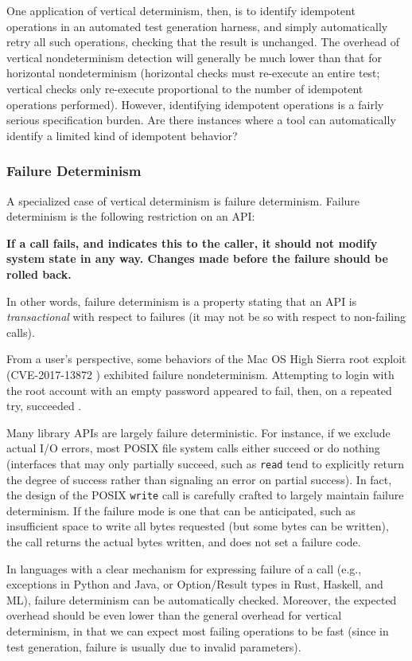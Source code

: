 One application of vertical determinism, then, is to identify
idempotent operations in an automated test generation harness, and
simply automatically retry all such operations, checking that the
result is unchanged.  The overhead of vertical nondeterminism detection will
generally be much lower than that for horizontal nondeterminism
(horizontal checks must re-execute an entire test; vertical checks
only re-execute proportional to the number of idempotent operations
performed).  However, identifying idempotent operations is a
fairly serious specification burden.  Are there instances where a tool
can automatically identify a limited kind of idempotent behavior?

\subsubsection{Failure Determinism}

A specialized case of vertical determinism is failure determinism.
Failure determinism is the following restriction on an API:

{\bf If a call fails, and indicates this to the caller, it should not modify system
  state in any way.  Changes made before the failure should be rolled
  back.} 

In other words, failure determinism is a property stating that an API
is \emph{transactional} with respect to failures (it may not be so
with respect to non-failing calls).

From a user's perspective, some behaviors of the Mac OS High Sierra
root exploit (CVE-2017-13872 \cite{applebug0}) exhibited failure
nondeterminism.  Attempting to login with the root account with an
empty password appeared to fail, then, on a repeated try, succeeded
\cite{applebug1,applebug2}. 

Many library APIs are largely failure deterministic.  For instance, if
we exclude actual I/O errors, most POSIX file system calls either
succeed or do nothing (interfaces that may only partially succeed,
such as {\tt read} tend to explicitly return the degree of success
rather than signaling an error on partial success).  In fact, the
design of the POSIX {\tt write} call is carefully crafted to largely maintain
failure determinism.  If the failure mode is one that can be
anticipated, such as insufficient space to write all bytes requested
(but some bytes can be written), the call returns the actual bytes
written, and does not set a failure code.

In languages with a clear mechanism for expressing failure of a call
(e.g., exceptions in Python and Java, or Option/Result types in Rust,
Haskell, and ML), failure determinism can be automatically checked.
Moreover, the expected overhead should be even lower than the general
overhead for vertical determinism, in that we can expect most failing
operations to be fast (since in test generation, failure is usually
due to invalid parameters).


